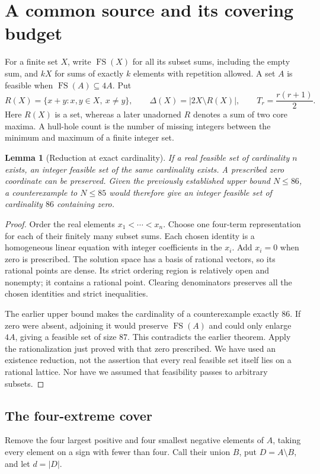 \documentclass[11pt,letterpaper]{article}
\newcommand{\FS}{\operatorname{FS}}
\newcommand{\card}[1]{\lvert#1\rvert}
\newtheorem{lemma}[theorem]{Lemma}
\theoremstyle{definition}\newtheorem{definition}[theorem]{Definition}
\begin{document}
\section{A common source and its covering budget}\label{sec:common-foundations}

For a finite set $X$, write $\FS(X)$ for all its subset sums, including
the empty sum, and $kX$ for sums of exactly $k$ elements with repetition
allowed. A set $A$ is feasible when $\FS(A)\subseteq4A$. Put
\[
R(X)=\{x+y:x,y\in X,\ x\ne y\},\qquad
\Delta(X)=\card{2X\setminus R(X)},\qquad T_r=\frac{r(r+1)}2.
\]
Here $R(X)$ is a set, whereas a later unadorned $R$ denotes a sum of two
core maxima. A hull-hole count is the number of missing integers between
the minimum and maximum of a finite integer set.

\begin{lemma}[Reduction at exact cardinality]\label{lem:common-rationalization}
If a real feasible set of cardinality $n$ exists, an integer feasible set
of the same cardinality exists. A prescribed zero coordinate can be
preserved. Given the previously established upper bound $N\le86$, a
counterexample to $N\le85$ would therefore give an integer feasible set
of cardinality $86$ containing zero.
\end{lemma}
\begin{proof}
Order the real elements $x_1<\cdots<x_n$. Choose one four-term
representation for each of their finitely many subset sums. Each chosen
identity is a homogeneous linear equation with integer coefficients in
the $x_i$. Add $x_i=0$ when zero is prescribed. The solution space has a
basis of rational vectors, so its rational points are dense. Its strict
ordering region is relatively open and nonempty; it contains a rational
point. Clearing denominators preserves all the chosen identities and
strict inequalities.

The earlier upper bound makes the cardinality of a counterexample
exactly $86$. If zero were absent, adjoining it would preserve
$\FS(A)$ and could only enlarge $4A$, giving a feasible set of size $87$.
This contradicts the earlier theorem. Apply the rationalization just
proved with that zero prescribed. We have used an existence reduction,
not the assertion that every real feasible set itself lies on a rational
lattice. Nor have we assumed that feasibility passes to arbitrary subsets.
\end{proof}

\subsection{The four-extreme cover}
Remove the four largest positive and four smallest negative elements of
$A$, taking every element on a sign with fewer than four. Call their
union $B$, put $D=A\setminus B$, and let $d=\card D$.
\end{document}

